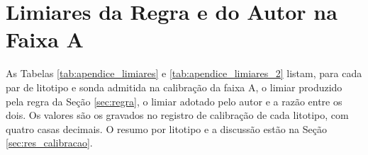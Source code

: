\chapter{Limiares da Regra e do Autor na Faixa A}
\label{apendice:limiares}


As Tabelas \ref{tab:apendice_limiares} e \ref{tab:apendice_limiares_2} listam, para cada par de litotipo e sonda admitida na calibração da faixa A, o limiar produzido pela regra da Seção \ref{sec:regra}, o limiar adotado pelo autor e a razão entre os dois. Os valores são os gravados no registro de calibração de cada litotipo, com quatro casas decimais. O resumo por litotipo e a discussão estão na Seção \ref{sec:res_calibracao}.

